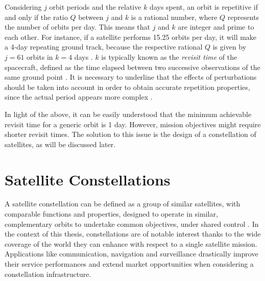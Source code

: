 Considering $j$ orbit periods and the relative $k$ days spent, an orbit is repetitive if and only if the ratio $Q$ between $j$ and $k$ is a rational number, where $Q$ represents the number of orbits per day.
This means that $j$ and $k$ are integer and prime to each other.
For instance, if a satellite performs 15.25 orbits per day, it will make a 4-day repeating ground track, because the respective rational $Q$ is given by $j=61$ orbits in $k=4$ days \cite{wertz2009orbit}.
$k$ is typically known as the \textit{revisit time} of the spacecraft, defined as the time elapsed between two successive observations of the same ground point \cite{luo2017novel}.
It is necessary to underline that the effects of perturbations should be taken into account in order to obtain accurate repetition properties, since the actual period appears more complex \cite{wertz2009orbit}. 

In light of the above, it can be easily understood that the minimum achievable revisit time for a generic orbit is 1 day.
However, mission objectives might require shorter revisit times.
The solution to this issue is the design of a constellation of satellites, as will be discussed later.



\section{Satellite Constellations}
A satellite constellation can be defined as a group of similar satellites, with comparable functions and properties, designed to operate in similar, complementary orbits to undertake common objectives, under shared control \cite{wood2003satellite}.
In the context of this thesis, constellations are of notable interest thanks to the wide coverage of the world they can enhance with respect to a single satellite mission. 
Applications like communication, navigation and surveillance drastically improve their service performances and extend market opportunities when considering a constellation infrastructure.



